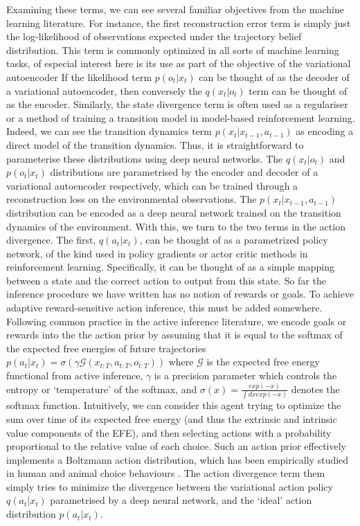 Examining these terms, we can see several familiar objectives from the machine learning literature. For instance, the first reconstruction error term is simply just the log-likelihood of observations expected under the trajectory belief distribution. This term is commonly optimized in all sorts of machine learning tasks, of especial interest here is its use as part of the objective of the variational autoencoder \citep{kingma_auto-encoding_2013} If the likelihood term $p(o_t | x_t)$ can be thought of as the decoder of a variational autoencoder, then conversely the $q(x_t | o_t)$ term can be thought of as the encoder. Similarly, the state divergence term is often used as a regulariser or a method of training a transition model in model-based reinforcement learning. Indeed, we can see the transition dynamics term $p(x_t | x_{t-1}, a_{t-1})$ as encoding a direct model of the transition dynamics. Thus, it is straightforward to parameterise these distributions using deep neural networks. The $q(x_t | o_t)$ and $p(o_t | x_t)$ distributions are parametrised by the encoder and decoder of a variational autoencoder respectively, which can be trained through a reconstruction loss on the environmental observations. The $p(x_t | x_{t-1}, a_{t-1})$ distribution can be encoded as a deep neural network trained on the transition dynamics of the environment. With this, we turn to the two terms in the action divergence. The first, $q(a_t | x_t)$, can be thought of as a parametrized policy network, of the kind used in policy gradients or actor critic methods in reinforcement learning. Specifically, it can be thought of as a simple mapping between a state and the correct action to output from this state. So far the inference procedure we have written has no notion of rewards or goals. To achieve adaptive reward-sensitive action inference, this must be added somewhere. Following common practice in the active inference literature, we encode goals or rewards into the
the action prior by assuming that it is equal to the softmax of the expected free energies of future trajectories $p(a_t | x_t) = \sigma(\gamma \mathcal{G}(x_{t:T}, a_{t:T}, o_{t:T}))$ where $\mathcal{G}$ is the expected free energy functional from active inference, $\gamma$ is a precision parameter which controls the entropy or `temperature' of the softmax, and $\sigma(x) = \frac{exp(-x)}{\int dx exp(-x)}$ denotes the softmax function. Intuitively, we can consider this agent trying to optimize the sum over time of its expected free energy (and thus the extrinsic and intrinsic value components of the EFE), and then selecting actions with a probability proportional to the relative value of each choice. Such an action prior effectively implements a Boltzmann action distribution, which has been empirically studied in human and animal choice behaviours \citep{daw2006cortical}. The action divergence term them simply tries to minimize the divergence between the variational action policy $q(a_t | x_t)$ parametrised by a deep neural network, and the `ideal' action distribution $p(a_t | x_t)$.

